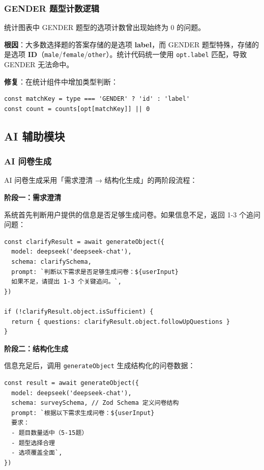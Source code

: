 \subsubsection{GENDER 题型计数逻辑}

统计图表中 GENDER 题型的选项计数曾出现始终为 0 的问题。

\textbf{根因}：大多数选择题的答案存储的是选项 \textbf{label}，而 GENDER 题型特殊，存储的是选项 \textbf{ID}（\texttt{male}/\texttt{female}/\texttt{other}）。统计代码统一使用 \texttt{opt.label} 匹配，导致 GENDER 无法命中。

\textbf{修复}：在统计组件中增加类型判断：

\begin{verbatim}
const matchKey = type === 'GENDER' ? 'id' : 'label'
const count = counts[opt[matchKey]] || 0
\end{verbatim}

\subsection{AI 辅助模块}

\subsubsection{AI 问卷生成}

AI 问卷生成采用「需求澄清 → 结构化生成」的两阶段流程：

\textbf{阶段一：需求澄清}

系统首先判断用户提供的信息是否足够生成问卷。如果信息不足，返回 1-3 个追问问题：

\begin{verbatim}
const clarifyResult = await generateObject({
  model: deepseek('deepseek-chat'),
  schema: clarifySchema,
  prompt: `判断以下需求是否足够生成问卷：${userInput}
  如果不足，请提出 1-3 个关键追问。`,
})

if (!clarifyResult.object.isSufficient) {
  return { questions: clarifyResult.object.followUpQuestions }
}
\end{verbatim}

\textbf{阶段二：结构化生成}

信息充足后，调用 \texttt{generateObject} 生成结构化的问卷数据：

\begin{verbatim}
const result = await generateObject({
  model: deepseek('deepseek-chat'),
  schema: surveySchema, // Zod Schema 定义问卷结构
  prompt: `根据以下需求生成问卷：${userInput}
  要求：
  - 题目数量适中（5-15题）
  - 题型选择合理
  - 选项覆盖全面`,
})
\end{verbatim}


